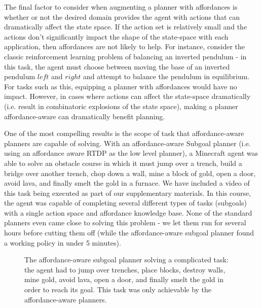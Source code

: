 \documentclass[]{article}
\begin{document}
The final factor to consider when augmenting a planner with affordances is whether or not the desired domain provides
the agent with actions that can dramatically affect the state space. If the action set is relatively small and the actions
don't significantly impact the shape of the state-space with each application, then affordances are not likely to help. For instance, consider the classic reinforcement learning problem of balancing an inverted pendulum - in this task, the agent must choose between moving the base of an inverted pendulum $left$ and $right$ and attempt to balance the pendulum in equilibrium. For tasks such as this, equipping a planner with affordances would have no impact. However, in cases where actions can affect the state-space dramatically (i.e. result in combinatoric explosions of the state space), making a planner affordance-aware can dramatically benefit planning.

One of the most compelling results is the scope of task that affordance-aware planners are capable of solving. With an affordance-aware Subgoal planner (i.e. using an affordance aware RTDP as the low level planner), a Minecraft agent was able to solve an obstacle course in which it must jump over a trench, build a bridge over another trench, chop down a wall, mine a block of gold, open a door, avoid lava, and finally smelt the gold in a furnace. We have included a video of this task being executed as part of our supplementary materials. In this course, the agent was capable of completing several different types of tasks (subgoals) with a single action space and affordance knowledge base. None of the standard planners even came close to solving this problem - we let them run for several hours before cutting them off (while the affordance-aware subgoal planner found a working policy in under 5 minutes).

\begin{figure}
\centering
%
%
%
%
  \caption{The affordance-aware subgoal planner solving a complicated task: the agent had to jump over trenches,
  place blocks, destroy walls, mine gold, avoid lava, open a door, and finally smelt the gold in order to reach its goal. This task
  was only achievable by the affordance-aware planners.}
\end{figure}
\end{document}
